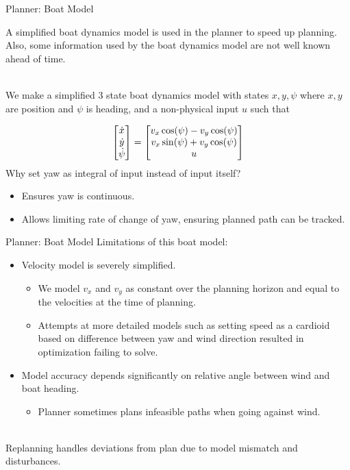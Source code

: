 \documentclass[10pt,xcolor={table,dvipsnames},t]{beamer}
\begin{document}
\begin{frame}{Planner: Boat Model}

    A simplified boat dynamics model is used in the planner to speed up planning.
    Also, some information used by the boat dynamics model are not well known 
    ahead of time.
    
    \hfill\\
    We make a simplified 3 state boat dynamics model with states \(x, y, \psi\) where 
    \(x, y\) are position and \(\psi\) is heading, and a non-physical input \(u\) 
    such that 
    
    \begin{equation}
        \mqty[\dot{x} \\ \dot{y} \\ \dot{\psi}]
         = \mqty[v_x \cos(\psi) - v_y \cos(\psi) \\ 
         v_x \sin(\psi) + v_y\cos(\psi) \\ 
         u]
    \end{equation}
    Why set yaw as integral of input instead of input itself?
    \begin{itemize}
        \item Ensures yaw is continuous.
        \item Allows limiting rate of change of yaw, ensuring planned path can be tracked.
    \end{itemize}

\end{frame}

\begin{frame}{Planner: Boat Model}
    Limitations of this boat model:
    \begin{itemize}
        \item Velocity model is severely simplified.
            \begin{itemize}
                \item We model \(v_x\) and \(v_y\) as constant over the planning horizon and equal to the velocities at the time of planning.
                \item Attempts at more detailed models such as setting speed as a cardioid based on difference between yaw and wind direction resulted in optimization failing to solve.
            \end{itemize}
        \item Model accuracy depends significantly on relative angle between wind and boat heading.
        \begin{itemize}
            \item Planner sometimes plans infeasible paths when going against wind.
        \end{itemize}
    \end{itemize}
    
    \hfill\\
    Replanning handles deviations from plan due to model mismatch and disturbances.
\end{frame}
\end{document}

